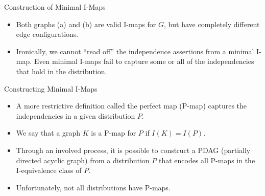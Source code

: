 \documentclass[11pt]{beamer}
\begin{document}
\captionsetup[subfigure]{position=bottom,labelformat=empty}

\begin{frame}{Construction of Minimal I-Maps}
\centering
\begin{figure}
\end{figure}
\begin{itemize}
	\item Both graphs (a) and (b) are valid I-maps for $G$, but have
	completely different edge configurations.
	\item Ironically, we cannot ``read off'' the independence assertions
	from a minimal I-map. Even minimal I-maps fail to capture some or all of
	the independencies that hold in the distribution.
\end{itemize}
\end{frame}

\begin{frame}{Constructing Minimal I-Maps}
\begin{itemize}
	\item A more restrictive definition called the perfect map (P-map)
	captures the independencies in a given distribution $P$.
	\item We say that a graph $K$ is a P-map for $P$ if $I(K) = I(P)$.
	\item Through an involved process, it is possible to construct a PDAG
	(partially directed acyclic graph) from a distribution $P$ that encodes
	all P-maps in the I-equivalence class of $P$.
	\item Unfortunately, not all distributions have P-maps.
\end{itemize}
\end{frame}
\end{document}

